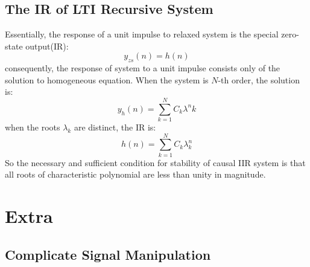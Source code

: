 \documentclass[10pt,a4paper,oneside]{article}
\begin{document}
\subsection{The IR of LTI Recursive System}
Essentially, the response of a unit impulse to relaxed system is the special zero-state output(IR):
\[
y_{zs}(n) =h(n)
\]
consequently, the response of system to a unit impulse consists only of the solution to homogeneous equation. When the system is $N$-th order, the solution is:
\[
y_h (n) = \sum_{k=1}^{N} C_k \lambda^n k
\]
when the roots $\lambda_k$ are distinct, the IR is:
\[
h (n) = \sum_{k=1}^{N} C_k \lambda^n_k
\]
So the necessary and sufficient condition for stability of causal IIR system is that all roots of characteristic polynomial are less than unity in magnitude. 












\section{Extra}
\subsection{Complicate Signal Manipulation}
\end{document}
